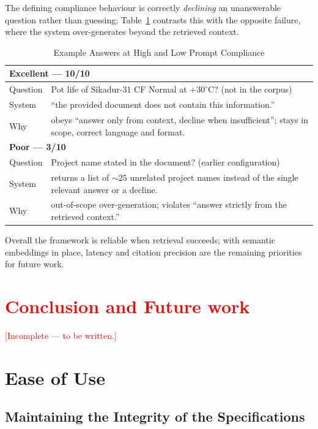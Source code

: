 \documentclass[10pt,a4paper,conference]{IEEEtran}
\begin{document}
The defining compliance behaviour is correctly \emph{declining} an unanswerable
question rather than guessing; Table~\ref{tab:excomp} contrasts this with the
opposite failure, where the system over-generates beyond the retrieved context.

\begin{table}[htbp]
\caption{Example Answers at High and Low Prompt Compliance}
\begin{center}
\footnotesize
\begin{tabular}{|p{}|p{}|}
\hline
\multicolumn{2}{|l|}{\textbf{Excellent --- 10/10}} \\
\hline
Question & Pot life of Sikadur-31 CF Normal at $+30^{\circ}$C? (not in the corpus) \\
\hline
System & ``the provided document does not contain this information.'' \\
\hline
Why & obeys ``answer only from context, decline when insufficient''; stays in scope, correct language and format. \\
\hline
\multicolumn{2}{|l|}{\textbf{Poor --- 3/10}} \\
\hline
Question & Project name stated in the document? (earlier configuration) \\
\hline
System & returns a list of ${\sim}25$ unrelated project names instead of the single relevant answer or a decline. \\
\hline
Why & out-of-scope over-generation; violates ``answer strictly from the retrieved context.'' \\
\hline
\end{tabular}
\label{tab:excomp}
\end{center}
\end{table}

Overall the framework is reliable when retrieval succeeds; with semantic
embeddings in place, latency and citation precision are the remaining
priorities for future work.

\section{\textcolor{red}{Conclusion and Future work}}
\textcolor{red}{[Incomplete — to be written.]}

\iffalse
\section{Ease of Use}

\subsection{Maintaining the Integrity of the Specifications}
\end{document}
